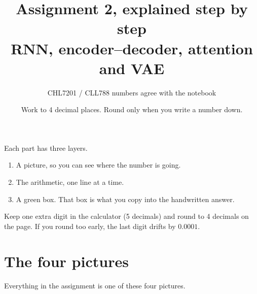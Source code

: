 \documentclass[11pt,a4paper]{article}
\title{\vspace{-1.2em}Assignment 2, explained step by step\\[0.3em]
\large RNN, encoder--decoder, attention and VAE}
\author{CHL7201 / CLL788 \quad\textperiodcentered\quad numbers agree with the notebook}
\date{Work to 4 decimal places. Round only when you write a number down.}
\begin{document}
\maketitle
\thispagestyle{fancy}

\begin{idea}
Each part has three layers.
\begin{enumerate}
  \item A picture, so you can see where the number is going.
  \item The arithmetic, one line at a time.
  \item A green box. That box is what you copy into the handwritten answer.
\end{enumerate}
Keep one extra digit in the calculator (5 decimals) and round to 4 decimals on the page. If you round too early, the last digit drifts by \(0.0001\).
\end{idea}

\tableofcontents
\vspace{0.6em}

\section{The four pictures}

Everything in the assignment is one of these four pictures.
\end{document}
